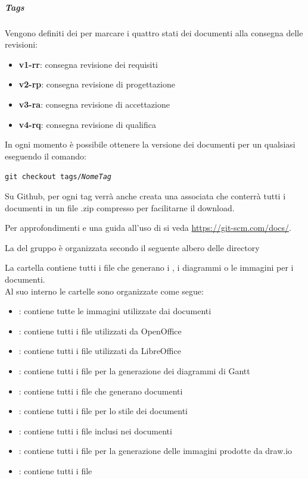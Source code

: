 \documentclass[12pt,a4paper]{article}
\begin{document}
\subparagraph{Tags} Vengono definiti dei  per marcare i quattro stati dei documenti alla consegna delle revisioni:

\begin{itemize}
    \item \textbf{v1-rr}: consegna revisione dei requisiti
    \item \textbf{v2-rp}: consegna revisione di progettazione
    \item \textbf{v3-ra}: consegna revisione di accettazione
    \item \textbf{v4-rq}: consegna revisione di qualifica
\end{itemize}

In ogni momento è possibile ottenere la versione dei documenti per un qualsiasi  eseguendo il comando:
\begin{center}
	\texttt{git checkout tags/\textit{NomeTag}}
\end{center}
Su Github, per ogni tag verrà anche creata una  associata che conterrà tutti i documenti in un file .zip compresso
per facilitarne il download.

Per approfondimenti e una guida all'uso di  si veda \url{https://git-scm.com/docs/}.

La  del gruppo è organizzata secondo il seguente albero delle directory


La cartella  contiene tutti i file che generano i , i diagrammi o le immagini per i documenti. \\
Al suo interno le cartelle sono organizzate come segue:

\begin{itemize}
    \item \textbf{}: contiene tutte le immagini utilizzate dai documenti
    \item \textbf{}: contiene tutti i file  utilizzati da OpenOffice
    \item \textbf{}: contiene tutti i file  utilizzati da LibreOffice
    \item \textbf{}: contiene tutti i file  per la generazione dei diagrammi di Gantt
    \item \textbf{}: contiene tutti i file \latex{} che generano documenti
    \item \textbf{}: contiene tutti i file  per lo stile dei documenti
    \item \textbf{}: contiene tutti i file  inclusi nei documenti \latex{}
    \item \textbf{}: contiene tutti i file  per la generazione delle immagini prodotte da draw.io
    \item \textbf{}: contiene tutti i file 
\end{itemize} 
\end{document}
